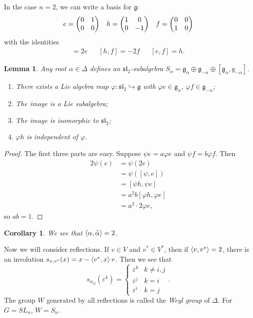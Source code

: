 \documentclass[leqno, openany]{memoir}
\DeclarePairedDelimiter{\gen}{\langle}{\rangle}
\newtheorem{cor}[thm]{Corollary}
\newtheorem{lem}[thm]{Lemma}
\theoremstyle{definition}
\theoremstyle{remark}
\theoremstyle{plain}
\theoremstyle{definition}
\theoremstyle{remark}
\newcommand{\ep}{\varepsilon}
\newcommand{\mf}[1]{\mathfrak{#1}}
\newcommand{\mr}[1]{\mathrm{#1}}
\begin{document}
In the case $n = 2$, we can write a basis for $\mf{g}$: \begin{align*} e =
    \mqty(0 & 1 \\ 0 & 0) & & h = \mqty(\dmat[0]{1,-1}) & & f = \mqty(0 & 0 \\
    1 & 0) \end{align*} with the identities \begin{align*} [h,e] = 2e & & [h,f]
    = -2f & & [e,f] = h.  \end{align*}

\begin{lem} Any root $\alpha \in \Delta$ defines an $\mf{sl}_2$-subalgebra
    $S_{\alpha} = \mf{g}_{\alpha} \oplus \mf{g}_{-\alpha} \oplus
    [\mf{g}_{\alpha}, \mr{g}_{-\alpha}]$.  \begin{enumerate} \item There exists
        a Lie algebra map $\varphi: \mf{sl}_2 \hookrightarrow \mf{g}$ with
        $\varphi e \in \mf{g}_{\alpha}$, $\varphi f \in \mf{g}_{-\alpha}$;
        \item The image is a Lie subalgebra; \item The image is isomorphic to
    $\mf{sl}_2$; \item $\varphi h$ is independent of $\varphi$.
    \end{enumerate} \end{lem}

\begin{proof} The first three parts are easy. Suppose $\psi e = a \varphi e$
    and $\psi f = b \varphi f$. Then \begin{align*} 2 \psi(e) &= \psi(2e) \\ &=
        \psi([\psi, e]) \\ &= [\psi h, \psi e] \\ &= a^2 b [\varphi h, \varphi
        e] \\ &= a^2 \cdot 2 \varphi e, \end{align*} so $ab = 1$.  \end{proof}

\begin{cor} We see that $\gen{\alpha, \check{\alpha}} = 2$.  \end{cor}

Now we will consider reflections. If $v \in V$ and $v^* \in V^*$, then if
        $\gen{v, v^*} = 2$, there is an involution $s_{v,v^*}(x) = x - \ev{v^*,
    x} v$. Then we see that \[ s_{\alpha_{ij}} (\ep^k) = \begin{cases} \ep^k &
        k \neq i,j \\ \ep^j & k = i \\ \ep^i & k = j \end{cases}. \] The group
        $W$ generated by all reflections is called the \textit{Weyl group} of
        $\Delta$. For $G = SL_n$, $W = S_n$.
\end{document}
